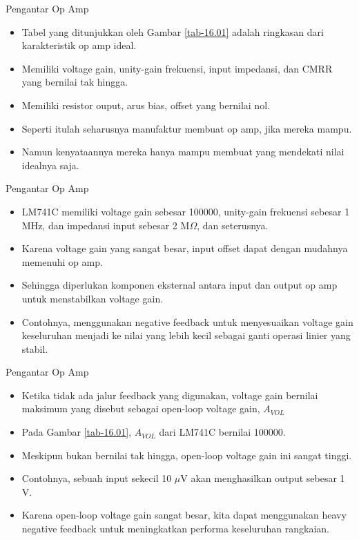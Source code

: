 \begin{frame}{Pengantar Op Amp}
	\begin{itemize}
		\item Tabel yang ditunjukkan oleh Gambar \ref{tab-16.01} adalah ringkasan dari karakteristik op amp ideal.
		\item Memiliki voltage gain, unity-gain frekuensi, input impedansi, dan CMRR yang bernilai tak hingga.
		\item Memiliki resistor ouput, arus bias, offset yang bernilai nol.
		\item Seperti itulah seharusnya manufaktur membuat op amp, jika mereka mampu.
		\item Namun kenyataannya mereka hanya mampu membuat yang mendekati nilai idealnya saja.
	\end{itemize}
\end{frame}

\begin{frame}{Pengantar Op Amp}
	\begin{itemize}
		\item LM741C memiliki voltage gain sebesar 100000, unity-gain frekuensi sebesar 1 MHz, dan impedansi input sebesar 2 M$ \Omega $, dan seterusnya.
		\item Karena voltage gain yang sangat besar, input offset dapat dengan mudahnya memenuhi op amp.
		\item Sehingga diperlukan komponen eksternal antara input dan output op amp untuk menstabilkan voltage gain.
		\item Contohnya, menggunakan negative feedback untuk menyesuaikan voltage gain keseluruhan menjadi ke nilai yang lebih kecil sebagai ganti operasi linier yang stabil.
	\end{itemize}
\end{frame}

\begin{frame}{Pengantar Op Amp}
	\begin{itemize}
		\item Ketika tidak ada jalur feedback yang digunakan, voltage gain bernilai maksimum yang disebut sebagai open-loop voltage gain, $ A_{VOL} $
		\item Pada Gambar \ref{tab-16.01}, $ A_{VOL} $ dari LM741C bernilai 100000.
		\item Meskipun bukan bernilai tak hingga, open-loop voltage gain ini sangat tinggi.
		\item Contohnya, sebuah input sekecil 10 $ \mu $V akan menghasilkan output sebesar 1 V.
		\item Karena open-loop voltage gain sangat besar, kita dapat menggunakan heavy negative feedback untuk meningkatkan performa keseluruhan rangkaian.
	\end{itemize}
\end{frame}

